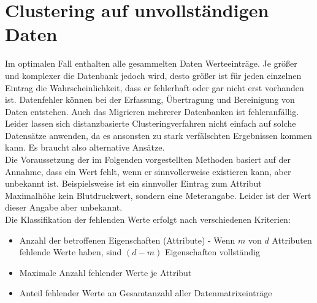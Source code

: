 \documentclass[11pt,ceqn]{book}
\begin{document}
\section{Clustering auf unvollständigen Daten}
Im optimalen Fall enthalten alle gesammelten Daten Werteeinträge. Je größer und komplexer die Datenbank jedoch wird, desto größer ist für jeden einzelnen Eintrag die Wahrscheinlichkeit, dass er fehlerhaft oder gar nicht erst vorhanden ist. Datenfehler können bei der Erfassung, Übertragung und Bereinigung von Daten entstehen. Auch das Migrieren mehrerer Datenbanken ist fehleranfällig. \\

Leider lassen sich distanzbasierte Clusteringverfahren nicht einfach auf solche Datensätze anwenden, da es ansonsten zu stark verfälschten Ergebnissen kommen kann. Es braucht also alternative Ansätze.\\

Die Voraussetzung der im Folgenden vorgestellten Methoden basiert auf der Annahme, dass ein Wert fehlt, wenn er sinnvollerweise existieren kann, aber unbekannt ist. Beispielsweise ist ein sinnvoller Eintrag zum Attribut Maximalhöhe kein Blutdruckwert, sondern eine Meterangabe. Leider ist der Wert dieser Angabe aber unbekannt.\\

Die Klassifikation der fehlenden Werte erfolgt nach verschiedenen Kriterien:

\begin{itemize}
\item Anzahl der betroffenen Eigenschaften (Attribute) - Wenn $m$ von $d$ Attributen fehlende Werte haben, sind $(d-m)$ Eigenschaften vollständig
\item Maximale Anzahl fehlender Werte je Attribut
\item Anteil fehlender Werte an Gesamtanzahl aller Datenmatrixeinträge
\end{itemize}
\end{document}
